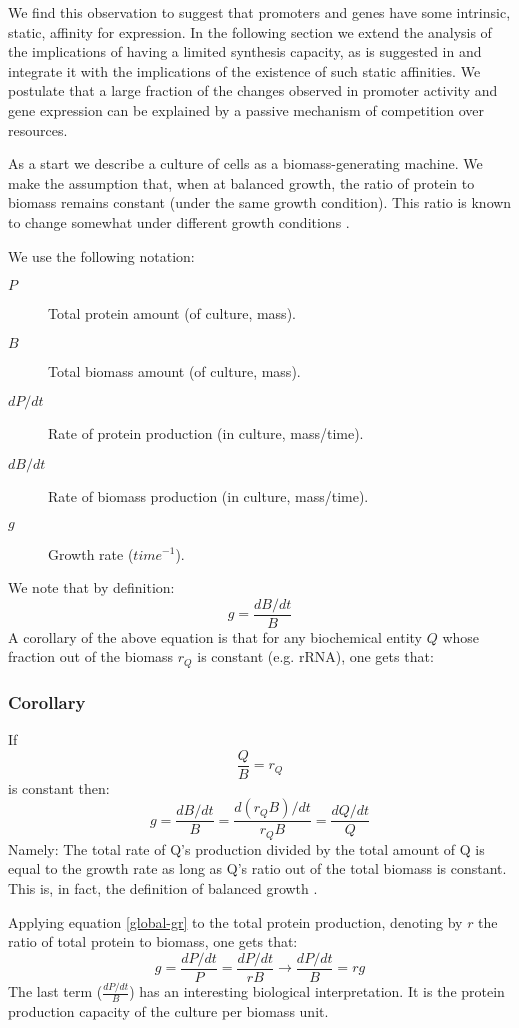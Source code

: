 \documentclass[a4page,notitlepage]{article}
\begin{document}
We find this observation to suggest that promoters and genes have some intrinsic, static, affinity for expression.
In the following section we extend the analysis of the implications of having a limited synthesis capacity, as is suggested in \cite{Leeat2013} and integrate it with the implications of the existence of such static affinities.
We postulate that a large fraction of the changes observed in promoter activity and gene expression can be explained by a passive mechanism of competition over resources.

As a start we describe a culture of cells as a biomass-generating machine.
We make the assumption that, when at balanced growth, the ratio of protein to biomass remains constant (under the same growth condition).
This ratio is known to change somewhat under different growth conditions \cite{Bremer1987}.

We use the following notation:
\begin{description}
\item[$P$] Total protein amount (of culture, mass).
\item[$B$] Total biomass amount (of culture, mass).
\item [$dP/dt$] Rate of protein production (in culture, mass/time).
\item [$dB/dt$] Rate of biomass production (in culture, mass/time).
\item [$g$] Growth rate ($time^{-1}$).
\end{description}
We note that by definition:
\[ g=\frac{dB/dt}{B}\]
A corollary of the above equation is that for any biochemical entity $Q$ whose fraction out of the biomass $r_Q$ is constant (e.g. rRNA), one gets that:
\subsubsection{Corollary}
If
\[\frac{Q}{B}=r_Q\]
is constant then:
\begin{equation}
\label{global-gr}
g=\frac{dB/dt}{B}=\frac{d(r_QB)/dt}{r_QB}=\frac{dQ/dt}{Q}
\end{equation}
Namely: The total rate of Q's production divided by the total amount of Q is equal to the growth rate as long as Q's ratio out of the total biomass is constant.
This is, in fact, the definition of balanced growth \cite{Campbell1957}.

Applying equation \ref{global-gr} to the total protein production, denoting by $r$ the ratio of total protein to biomass, one gets that:
\[g=\frac{dP/dt}{P}=\frac{dP/dt}{rB}\rightarrow\frac{dP/dt}{B}=rg\]
The last term ($\frac{dP/dt}{B}$) has an interesting biological interpretation.
It is the protein production capacity of the culture per biomass unit.
\end{document}
